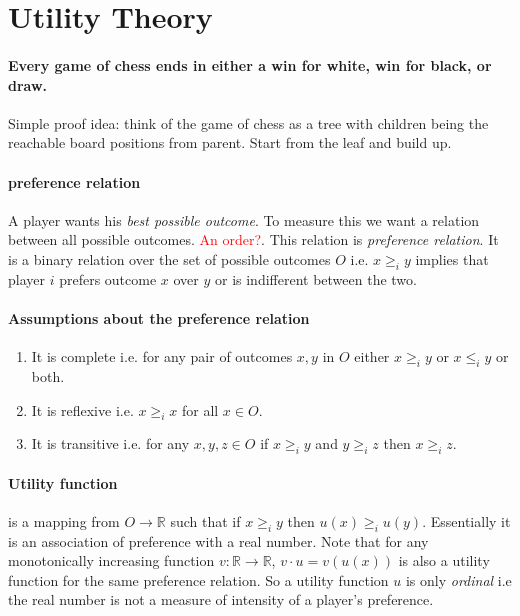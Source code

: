 \section{Utility Theory}
\paragraph{Every game of chess ends in either a win for white, win for black, or draw.}
Simple proof idea: think of the game of chess as a tree with children being the reachable board positions from parent. Start from the leaf and build up.

\paragraph{preference relation} A player wants his \textit{best possible outcome}. To measure this we want a relation between all possible outcomes. \textcolor{red}{An order?}. This relation is \textit{preference relation}.
It is a binary relation over the set of possible outcomes $O$ i.e. $x \geq_{i} y$ implies that player $i$ prefers outcome $x$ over $y$ or is indifferent between the two.

\paragraph{Assumptions about the preference relation}
\begin{enumerate}
    \item It is complete i.e. for any pair of outcomes $x, y$ in $O$ either $x \geq_{i} y$ or $x \leq_{i} y$  or both.
    \item It is reflexive i.e. $x \geq_{i} x$ for all $x \in O$.
    \item It is transitive i.e. for any $x,y,z \in O$ if $x \geq_{i} y$ and $y \geq_{i} z$ then $x \geq_{i} z$.
\end{enumerate}

\paragraph{Utility function} is a mapping from $O \to \mathbb{R}$ such that if $x \geq_{i} y$ then $u(x) \geq_{i} u(y)$. Essentially it is an association of preference with a real number.
Note that for any monotonically increasing function $v:\mathbb{R} \to \mathbb{R}$, $v \cdot u = v(u(x))$ is also a utility function for the same preference relation. So a utility function $u$ is only \textit{ordinal} i.e the real number is not a measure of intensity of a player's preference.

